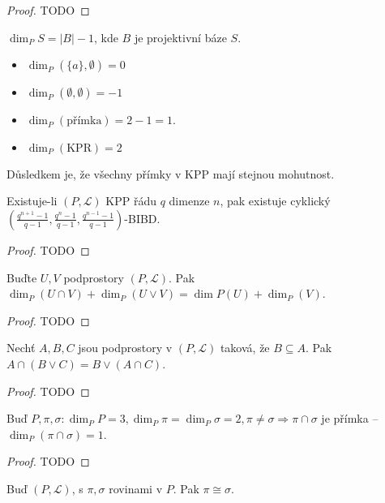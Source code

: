 \begin{proof}
    TODO
\end{proof}
\begin{definition}[Dimenze]
    $\dim_P S=|B|-1$, kde $B$ je projektivní báze $S$.
\end{definition}
\begin{note}[O dimenzi]
    \begin{itemize}
        \item $\dim_P(\{a\},\emptyset)=0$
        \item $\dim_P(\emptyset, \emptyset)=-1$
        \item $\dim_P(\text{přímka})=2-1=1$.
        \item $\dim_P(\text{KPR})=2$
    \end{itemize}

    Důsledkem je, že všechny přímky v KPP mají stejnou mohutnost.
\end{note}
\begin{theorem}
    Existuje-li $(P,\mathcal{L})$ KPP řádu $q$ dimenze $n$, pak existuje cyklický $(\frac{q^{n+1}-1}{q-1},\frac{q^n-1}{q-1},\frac{q^{n-1}-1}{q-1})$-BIBD.
\end{theorem}
\begin{proof}
    TODO
\end{proof}
\begin{theorem}
    Buďte $U,V$ podprostory $(P,\mathcal{L})$.
    Pak $\dim_P(U\cap V) + \dim_P(U\lor V) = \dim P(U)+\dim_P(V)$.
\end{theorem}
\begin{proof}
    TODO
\end{proof}
\begin{theorem}[Modularita]
    Nechť $A,B,C$ jsou podprostory v $(P,\mathcal{L})$ taková, že $B\subseteq A$.
    Pak $A\cap(B\lor C) = B\lor(A\cap C)$.
\end{theorem}
\begin{proof}
    TODO
\end{proof}
\begin{consequence}
    Buď $P,\pi,\sigma: \dim_P P=3, \dim_P\pi = \dim_P\sigma=2, \pi\neq\sigma\Rightarrow \pi\cap\sigma$ je přímka -- $\dim_P(\pi\cap\sigma)=1$.
\end{consequence}
\begin{proof}
    TODO
\end{proof}
\begin{theorem}
    Buď $(P,\mathcal{L})$, s $\pi,\sigma$ rovinami v $P$.
    Pak $\pi\cong\sigma$.
\end{theorem}
